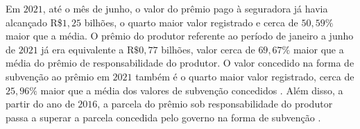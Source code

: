 Em $2021$, até o mês de junho, o valor do prêmio pago à seguradora já havia alcançado R\$$1,25$ bilhões, o quarto maior valor registrado e cerca de $50,59\%$ maior que a média. O prêmio do produtor referente ao período de janeiro a junho de $2021$ já era equivalente a R$\$0,77$ bilhões, valor cerca de $69,67\%$ maior que a média do prêmio de responsabilidade do produtor. O valor concedido na forma de subvenção ao prêmio em $2021$ também é o quarto maior valor registrado, cerca de $25,96\%$ maior que a média dos valores de subvenção concedidos . Além disso, a partir do ano de $2016$, a parcela do prêmio sob responsabilidade do produtor passa a superar a parcela concedida pelo governo na forma de subvenção \cite{brasil21b}.





